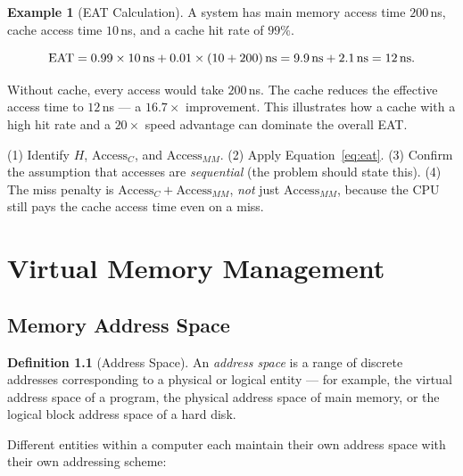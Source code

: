 \documentclass[11pt, a4paper, notitlepage]{report}
\theoremstyle{definition}
\newtheorem{definition}[theorem]{Definition}
\theoremstyle{remark}
\theoremstyle{definition}
\newtheorem{example}[theorem]{Example}
\begin{document}
\begin{example}[EAT Calculation]
  \label{ex:eat}
  A system has main memory access time $200$\,ns, cache access time $10$\,ns, and a cache hit rate of $99\%$.

  \[
    \text{EAT} = 0.99 \times 10\text{\,ns} + 0.01 \times (10 + 200)\text{\,ns}
               = 9.9\text{\,ns} + 2.1\text{\,ns} = 12\text{\,ns}.
  \]

  Without cache, every access would take $200$\,ns. The cache reduces the effective access time to $12$\,ns — a $16.7\times$ improvement. This illustrates how a cache with a high hit rate and a $20\times$ speed advantage can dominate the overall EAT.
\end{example}

\begin{examtip}[title={Exam Tip: EAT Steps}]
  (1) Identify $H$, $\text{Access}_C$, and $\text{Access}_{MM}$. (2) Apply Equation~\eqref{eq:eat}. (3) Confirm the assumption that accesses are \emph{sequential} (the problem should state this). (4) The miss penalty is $\text{Access}_C + \text{Access}_{MM}$, \emph{not} just $\text{Access}_{MM}$, because the CPU still pays the cache access time even on a miss.
\end{examtip}

\chapter{Virtual Memory Management}
\label{chap:virtual-memory}

\section{Memory Address Space}
\label{sec:address-space}

\begin{definition}[Address Space]
  \label{def:address-space}
  An \emph{address space} is a range of discrete addresses corresponding to a physical or logical entity — for example, the virtual address space of a program, the physical address space of main memory, or the logical block address space of a hard disk.
\end{definition}

Different entities within a computer each maintain their own address space with their own addressing scheme:
\end{document}

